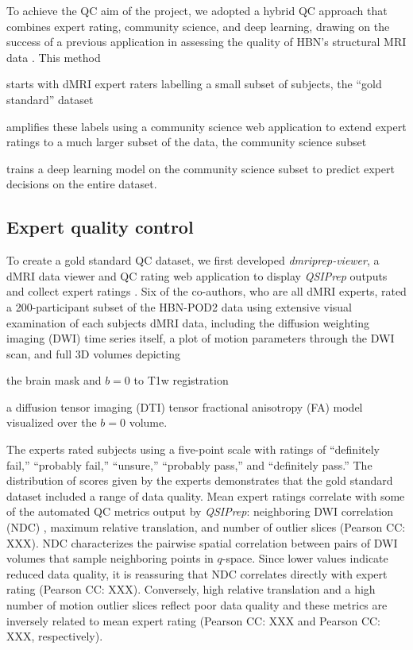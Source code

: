 \documentclass[fleqn,10pt]{wlscirep}
\begin{document}
To achieve the QC aim of the project, we adopted a hybrid QC approach that
combines expert rating, community science, and deep learning, drawing on the
success of a previous application in assessing the quality of HBN's structural
MRI data \cite{keshavan2019-er}. This method
\begin{enumerate*}[%
    label=(\roman*),%
    before={{ }},%
    itemjoin={{, }},%
    itemjoin*={{ and }}]
    \item starts with dMRI expert raters labelling a small subset of subjects,
    the ``gold standard'' dataset
    \item amplifies these labels using a community science web application to
    extend expert ratings to a much larger subset of the data, the community
    science subset
    \item trains a deep learning model on the community science subset to
    predict expert decisions on the entire dataset.
\end{enumerate*}

\subsection*{Expert quality control}

To create a gold standard QC dataset, we first developed \emph{dmriprep-viewer},
a dMRI data viewer and QC rating web application to display \emph{QSIPrep}
outputs and collect expert ratings \cite{richie-halford2021-viewer}. Six of the
co-authors, who are all dMRI experts, rated a 200-participant subset of the
HBN-POD2 data using extensive visual examination of each subjects dMRI data,
including the diffusion weighting imaging (DWI) time series itself, a plot of
motion parameters through the DWI scan, and full 3D volumes depicting
\begin{enumerate*}[%
    label=(\roman*),%
    before={{ }},%
    itemjoin={{, }},%
    itemjoin*={{ and }}]
    \item the brain mask and $b=0$ to T1w registration
    \item a diffusion tensor imaging (DTI) tensor fractional anisotropy (FA)
    model visualized over the $b=0$ volume.
\end{enumerate*}
The experts rated subjects using a five-point scale with ratings of ``definitely
fail,'' ``probably fail,'' ``unsure,'' ``probably pass,'' and ``definitely
pass.'' The distribution of scores given by the experts demonstrates that the
gold standard dataset included a range of data quality. Mean expert ratings
correlate with some of the automated QC metrics output by \emph{QSIPrep}:
neighboring DWI correlation (NDC) \cite{yeh2019-kb}, maximum relative
translation, and number of outlier slices (Pearson CC: XXX). NDC characterizes
the pairwise spatial correlation between pairs of DWI volumes that sample
neighboring points in $q$-space. Since lower values indicate reduced data
quality, it is reassuring that NDC correlates directly with expert rating
(Pearson CC: XXX). Conversely, high relative translation and a high number of
motion outlier slices reflect poor data quality and these metrics are inversely
related to mean expert rating (Pearson CC: XXX and Pearson CC: XXX,
respectively).
\end{document}
